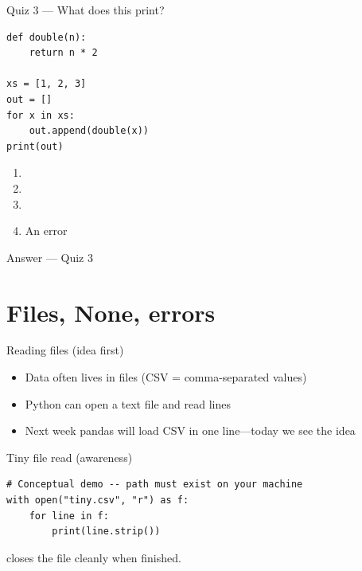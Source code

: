 \documentclass[aspectratio=169,11pt]{beamer}
\begin{document}
    \begin{frame}[fragile]{Quiz 3 --- What does this print?}
        \begin{lstlisting}
def double(n):
    return n * 2

xs = [1, 2, 3]
out = []
for x in xs:
    out.append(double(x))
print(out)
        \end{lstlisting}
        \begin{enumerate}
            \item \pycode{[1, 2, 3]}
            \item \pycode{[2, 4, 6]}
            \item {}
            \item An error
        \end{enumerate}
        \quizpause
    \end{frame}

    \begin{frame}{Answer --- Quiz 3}
    \end{frame}

    \section{Files, None, errors}

    \begin{frame}{Reading files (idea first)}
        \begin{itemize}
            \item Data often lives in files (CSV = comma-separated values)
            \item Python can open a text file and read lines
            \item Next week pandas will load CSV in one line---today we see the idea
        \end{itemize}
    \end{frame}

    \begin{frame}[fragile]{Tiny file read (awareness)}
        \begin{lstlisting}
# Conceptual demo -- path must exist on your machine
with open("tiny.csv", "r") as f:
    for line in f:
        print(line.strip())
        \end{lstlisting}
        \vspace{0.3em}
         closes the file cleanly when finished.
    \end{frame}
\end{document}
